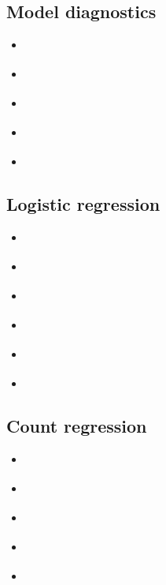 \documentclass{report}
\begin{document}
\subsection{Model diagnostics}

\begin{itemize}
    \item \cite[Chapter~8.4]{faraway_extending_2016}
    \item \cite[Chapter~6.9]{wakefield_bayesian_2013}
    \item \cite[Chapter~4.4]{agresti_foundations_2015}
    \item \cite[Chapter~4]{hardin_generalized_2018}
    \item \cite[Chapter~8]{dunn_generalized_2018}
\end{itemize}

\subsection{Logistic regression}

\begin{itemize}
    \item \cite[Chapter~2]{faraway_extending_2016}
    \item \cite[Chapter~7]{dobson_introduction_2018}
    \item \cite[Chapter~7]{wakefield_bayesian_2013}
    \item \cite[Chapter~5]{agresti_foundations_2015}
    \item \cite[Chapters~9-11]{hardin_generalized_2018}
    \item \cite[Chapter~9]{dunn_generalized_2018}
\end{itemize}

\subsection{Count regression}

\begin{itemize}
    \item \cite[Chapter~9]{dobson_introduction_2018}
    \item \cite[Chapter~5]{faraway_extending_2016}
    \item \cite[Chapter~7]{agresti_foundations_2015}
    \item \cite[Chapters~12-14]{hardin_generalized_2018}
    \item \cite[Chapter~10]{dunn_generalized_2018}
\end{itemize}
\end{document}
